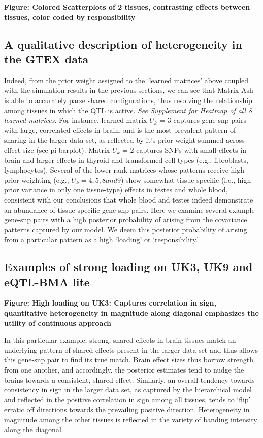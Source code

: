 \textbf{Figure: Colored Scatterplots of 2 tissues, contrasting effects between tissues, color coded by responsibility}
\newline

\subsection{A qualitative description of heterogeneity in the GTEX data}
 
Indeed, from the prior weight assigned to the `learned matrices' above coupled with the simulation results in the previous sections, we can see that Matrix Ash is able to accurately parse shared configurations, thus resolving the relationship among tissues in which the QTL is active. \textit{See Supplement for Heatmap of all 8 learned matrices}.  For instance, learned matrix $U_{k}$ = 3 captures gene-snp pairs with large, correlated effects in brain, and is the most prevalent pattern of sharing in the larger data set, as reflected by it's prior weight summed across effect size (see pi barplot). Matrix $U_{k}$ = 2 captures SNPs with small effects in brain and larger effects in thyroid and transformed cell-types (e.g., fibroblasts, lymphocytes). Several of the lower rank matrices whose patterns receive high prior weighting (e.g., $U_{k} = 4,5,8 and 9$) show somewhat tissue specific (i.e., high prior variance in only one tissue-type) effects in testes and whole blood, consistent with our conclusions that whole blood and testes indeed demonstrate an abundance of tissue-specific gene-snp pairs. Here we examine several example gene-snp pairs with a high posterior probability of arising from the covariance patterns captured by our model. We deem this posterior probability of arising from a particular pattern as a high `loading' or `responsibility.' 


\subsection{Examples of strong loading on UK3, UK9 and eQTL-BMA lite}

\newline
\textbf{Figure: High loading on UK3: Captures correlation in sign, quantitative heterogeneity in magnitude along diagonal emphasizes the utility of continuous approach}
\newline

In this particular example, strong, shared effects in brain tissues match an underlying pattern of shared effects present in the larger data set and thus allows this gene-snp pair to find its true match. Brain effect sizes thus borrow strength from one another, and accordingly, the posterior estimates tend to nudge the brains towards a consistent, shared effect. Similarly, an overall tendency towards consistency in sign in the larger data set, as captured by the hierarchical model and reflected in the positive correlation in sign among all tissues, tends to `flip' erratic off directions towards the prevailing positive direction. Heterogeneity in magnitude among the other tissues is reflected in the variety of banding intensity along the diagonal.\newline


